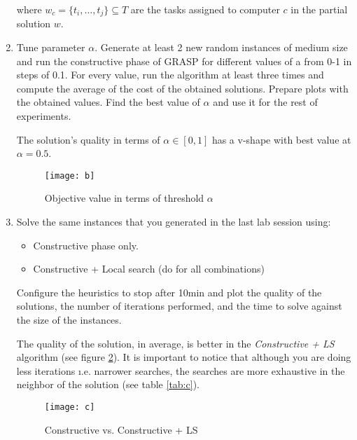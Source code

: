 \documentclass[12pt, a4paper]{article}
\begin{document}
\begin{enumerate}[label=(\alph*)]
    where $w_{c} = \{t_{i}, \ldots, t_{j} \} \subseteq T$ are the tasks assigned to computer $c$ in the partial solution $w$.

    \item[\textcolor{QuestionBlue}{\textbullet}] \textcolor{QuestionBlue}{Tune parameter $\alpha$. Generate at least 2 new random instances of medium size and run the constructive phase of GRASP for different  values of a from 0-1 in steps of 0.1. For every value, run the algorithm at least three times and compute the average of the cost of the obtained solutions. Prepare plots with the obtained values. Find the best value of $\alpha$ and use it for the rest of experiments.}

    The solution's quality in terms of $\alpha \in [0,1]$ has a v-shape with best value at $\alpha = 0.5$.

    \begin{figure}[H]
      \texttt{[image: b]}
      \caption{Objective value in terms of threshold $\alpha$}
      \label{fig:b}
    \end{figure}

    \item[\textcolor{QuestionBlue}{\textbullet}] \textcolor{QuestionBlue}{Solve the same instances that you generated in the last lab session using:
      \begin{itemize}
          \item Constructive phase only.
          \item Constructive + Local search (do for all combinations)
      \end{itemize}
    Configure the heuristics to stop after 10min and plot the quality of the solutions, the number of iterations performed, and the time to solve against the size of the instances.}

    The quality of the solution, in average, is better in the \textit{Constructive + LS} algorithm (see figure \ref{fig:c}).
    It is important to notice that although you are doing less iterations \i.e. narrower searches, the searches are more exhaustive
    in the neighbor of the solution (see table \ref{tab:c}).

    \begin{figure}[H]
      \texttt{[image: c]}
      \caption{Constructive vs. Constructive + LS}
      \label{fig:c}
    \end{figure}


\end{enumerate}
\end{document}
